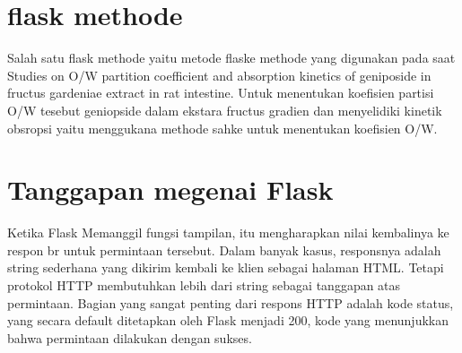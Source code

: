\section{flask methode}
Salah satu flask methode yaitu metode flaske methode yang digunakan pada saat Studies on O/W partition coefficient and absorption kinetics of geniposide in fructus gardeniae extract in rat intestine. Untuk menentukan koefisien partisi O/W tesebut geniopside dalam ekstara fructus gradien dan menyelidiki kinetik obsropsi yaitu menggukana methode sahke untuk menentukan koefisien O/W.

\section{Tanggapan megenai Flask}
Ketika Flask Memanggil fungsi tampilan, itu mengharapkan nilai kembalinya ke respon br untuk permintaan tersebut. Dalam banyak kasus, responsnya adalah string sederhana yang dikirim kembali ke klien sebagai halaman HTML. Tetapi protokol HTTP membutuhkan lebih dari string sebagai tanggapan atas permintaan. Bagian yang sangat penting dari respons HTTP adalah kode status, yang secara default ditetapkan oleh Flask menjadi 200, kode yang menunjukkan bahwa permintaan dilakukan dengan sukses.





